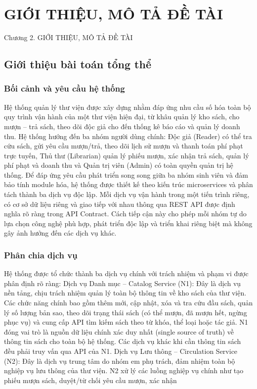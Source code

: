 \chapter{GIỚI THIỆU, MÔ TẢ ĐỀ TÀI}

Chương 2. GIỚI THIỆU, MÔ TẢ ĐỀ TÀI

\section{Giới thiệu bài toán tổng thể}

\subsection{Bối cảnh và yêu cầu hệ thống}

Hệ thống quản lý thư viện được xây dựng nhằm đáp ứng nhu cầu số hóa toàn bộ quy trình vận hành của một thư viện hiện đại, từ khâu quản lý kho sách, cho mượn – trả sách, theo dõi độc giả cho đến thống kê báo cáo và quản lý doanh thu. Hệ thống hướng đến ba nhóm người dùng chính: Độc giả (Reader) có thể tra cứu sách, gửi yêu cầu mượn/trả, theo dõi lịch sử mượn và thanh toán phí phạt trực tuyến, Thủ thư (Librarian) quản lý phiếu mượn, xác nhận trả sách, quản lý phí phạt và doanh thu và Quản trị viên (Admin) có toàn quyền quản trị hệ thống. Để đáp ứng yêu cầu phát triển song song giữa ba nhóm sinh viên và đảm bảo tính module hóa, hệ thống được thiết kế theo kiến trúc microservices và phân tách thành ba dịch vụ độc lập. Mỗi dịch vụ vận hành trong một tiến trình riêng, có cơ sở dữ liệu riêng và giao tiếp với nhau thông qua REST API được định nghĩa rõ ràng trong API Contract. Cách tiếp cận này cho phép mỗi nhóm tự do lựa chọn công nghệ phù hợp, phát triển độc lập và triển khai riêng biệt mà không gây ảnh hưởng đến các dịch vụ khác.

\subsection{Phân chia dịch vụ}

Hệ thống được tổ chức thành ba dịch vụ chính với trách nhiệm và phạm vi được phân định rõ ràng: Dịch vụ Danh mục – Catalog Service (N1): Đây là dịch vụ nền tảng, chịu trách nhiệm quản lý toàn bộ thông tin về kho sách của thư viện. Các chức năng chính bao gồm thêm mới, cập nhật, xóa và tra cứu đầu sách, quản lý số lượng bản sao, theo dõi trạng thái sách (có thể mượn, đã mượn hết, ngừng phục vụ) và cung cấp API tìm kiếm sách theo từ khóa, thể loại hoặc tác giả. N1 đóng vai trò là nguồn dữ liệu chính xác duy nhất (single source of truth) về thông tin sách cho toàn bộ hệ thống. Các dịch vụ khác khi cần thông tin sách đều phải truy vấn qua API của N1. Dịch vụ Lưu thông – Circulation Service (N2): Đây là dịch vụ trung tâm do nhóm em phụ trách, đảm nhiệm toàn bộ nghiệp vụ lưu thông của thư viện. N2 xử lý các luồng nghiệp vụ chính như tạo phiếu mượn sách, duyệt/từ chối yêu cầu mượn, xác nhận

